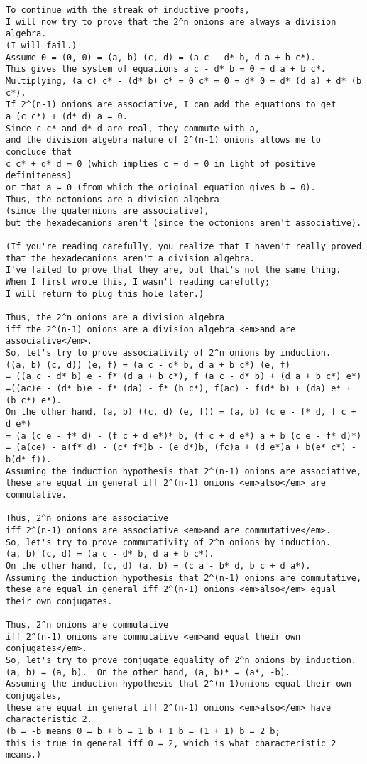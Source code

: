 \begin{verbatim}
To continue with the streak of inductive proofs,
I will now try to prove that the 2^n onions are always a division algebra.
(I will fail.)
Assume 0 = (0, 0) = (a, b) (c, d) = (a c - d* b, d a + b c*).
This gives the system of equations a c - d* b = 0 = d a + b c*.
Multiplying, (a c) c* - (d* b) c* = 0 c* = 0 = d* 0 = d* (d a) + d* (b c*).
If 2^(n-1) onions are associative, I can add the equations to get
a (c c*) + (d* d) a = 0.
Since c c* and d* d are real, they commute with a,
and the division algebra nature of 2^(n-1) onions allows me to conclude that
c c* + d* d = 0 (which implies c = d = 0 in light of positive definiteness)
or that a = 0 (from which the original equation gives b = 0).
Thus, the octonions are a division algebra
(since the quaternions are associative),
but the hexadecanions aren't (since the octonions aren't associative).

(If you're reading carefully, you realize that I haven't really proved
that the hexadecanions aren't a division algebra.
I've failed to prove that they are, but that's not the same thing.
When I first wrote this, I wasn't reading carefully;
I will return to plug this hole later.)

Thus, the 2^n onions are a division algebra
iff the 2^(n-1) onions are a division algebra <em>and are associative</em>.
So, let's try to prove associativity of 2^n onions by induction.
((a, b) (c, d)) (e, f) = (a c - d* b, d a + b c*) (e, f)
= ((a c - d* b) e - f* (d a + b c*), f (a c - d* b) + (d a + b c*) e*)
=((ac)e - (d* b)e - f* (da) - f* (b c*), f(ac) - f(d* b) + (da) e* + (b c*) e*).
On the other hand, (a, b) ((c, d) (e, f)) = (a, b) (c e - f* d, f c + d e*)
= (a (c e - f* d) - (f c + d e*)* b, (f c + d e*) a + b (c e - f* d)*)
= (a(ce) - a(f* d) - (c* f*)b - (e d*)b, (fc)a + (d e*)a + b(e* c*) - b(d* f)).
Assuming the induction hypothesis that 2^(n-1) onions are associative,
these are equal in general iff 2^(n-1) onions <em>also</em> are commutative.

Thus, 2^n onions are associative
iff 2^(n-1) onions are associative <em>and are commutative</em>.
So, let's try to prove commutativity of 2^n onions by induction.
(a, b) (c, d) = (a c - d* b, d a + b c*).
On the other hand, (c, d) (a, b) = (c a - b* d, b c + d a*).
Assuming the induction hypothesis that 2^(n-1) onions are commutative,
these are equal in general iff 2^(n-1) onions <em>also</em> equal their own conjugates.

Thus, 2^n onions are commutative
iff 2^(n-1) onions are commutative <em>and equal their own conjugates</em>.
So, let's try to prove conjugate equality of 2^n onions by induction.
(a, b) = (a, b).  On the other hand, (a, b)* = (a*, -b).
Assuming the induction hypothesis that 2^(n-1)onions equal their own conjugates,
these are equal in general iff 2^(n-1) onions <em>also</em> have characteristic 2.
(b = -b means 0 = b + b = 1 b + 1 b = (1 + 1) b = 2 b;
this is true in general iff 0 = 2, which is what characteristic 2 means.)


\end{verbatim}

